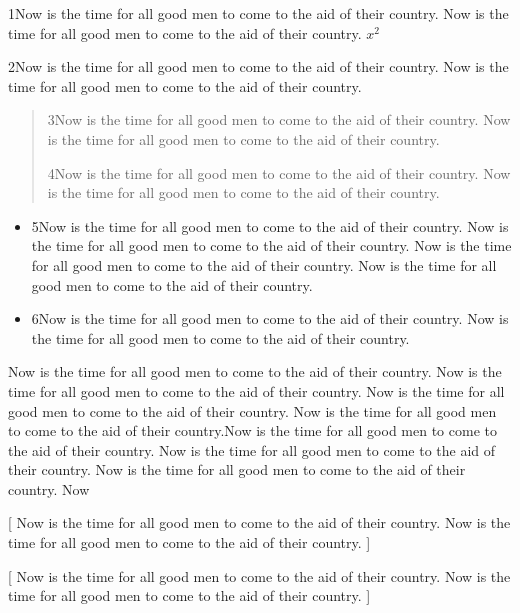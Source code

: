\documentclass{article}
\begin{document}
1Now is the time for all good men to come to the aid of their country. Now is the time for all good men to come to the aid of their country. $x^2$

2Now is the time for all good men to come to the aid of their country. Now is the time for all good men to come to the aid of their country.
\begin{quotation}
	3Now is the time for all good men to come to the aid of their country. Now is the time for all good men to come to the aid of their country.

	4Now is the time for all good men to come to the aid of their country. Now is the time for all good men to come to the aid of their country.
\end{quotation}

\begin{itemize}
	\item 5Now is the time for all good men to come to the aid of their country.  Now is the time for all good men to come to the aid of their country. Now is the time for all good men to come to the aid of their country. Now is the time for all good men to come to the aid of their country.

	\item 6Now is the time for all good men to come to the aid of their country.  Now is the time for all good men to come to the aid of their country.
\end{itemize}

\ifnum
	Now is the time for all good men to come to the aid of their country. Now is the time for all good men to come to the aid of their country. Now is the time for all good men to come to the aid of their country. Now is the time for all good men to come to the aid of their country.\else Now is the time for all good men to come to the aid of their country. Now is the time for all good men to come to the aid of their country. Now is the time for all good men to come to the aid of their country. Now
\fi

[
	Now is the time for all good men to come to the aid of their country. Now is the time for all good men to come to the aid of their country.
]

[
	Now is the time for all good men to come to the aid of their country. Now is the time for all good men to come to the aid of their country.
]
\end{document}
